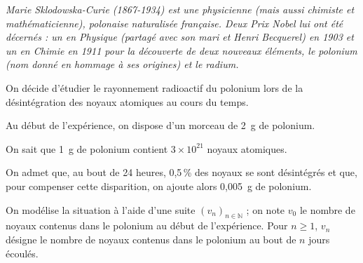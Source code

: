 \emph{Marie Sklodowska-Curie (1867-1934) est une physicienne (mais aussi chimiste et mathématicienne), polonaise naturalisée française. Deux Prix Nobel lui ont été décernés : un en Physique (partagé avec son mari et Henri Becquerel) en 1903 et un en Chimie en 1911 pour la découverte de deux nouveaux éléments, le polonium (nom donné en hommage à ses origines) et le radium.}

\medskip

On décide d'étudier le rayonnement radioactif du polonium lors de la désintégration des noyaux atomiques au cours du temps.

\smallskip

Au début de l'expérience, on dispose d'un morceau de 2~g de polonium.

On sait que 1~g de polonium contient $3 \times 10^{21}$ noyaux atomiques.

On admet que, au bout de 24 heures, 0,5\,\% des noyaux se sont désintégrés et que, pour compenser cette disparition, on ajoute alors 0,005~g de polonium. 

\smallskip

On modélise la situation à l'aide d'une suite  $\left(v_n\right)_{n \in \mathbb{N}}$ ; on note $v_0$ le nombre de noyaux contenus dans le polonium au début de l'expérience. Pour $n \geqslant 1$, $v_n$ désigne le nombre de noyaux contenus dans le polonium au bout de $n$ jours écoulés.

